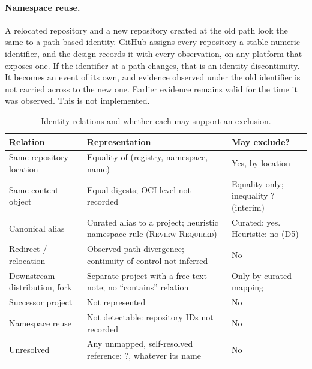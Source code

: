 \documentclass[11pt,a4paper]{article}
\newcommand{\Ind}{\textsf{?}}
\begin{document}
\paragraph{Namespace reuse.} A relocated repository and a new
repository created at the old path look the same to a path-based
identity. GitHub assigns every repository a stable numeric
identifier, and the design records it with every observation, on any
platform that exposes one. If the
identifier at a path changes, that is an identity discontinuity. It
becomes an event of its own, and evidence observed under the old
identifier is not carried across to the new one. Earlier evidence
remains valid for the time it was observed. This is not implemented.

\begin{table}[t]
\centering
\footnotesize
\begin{tabularx}{\linewidth}{@{}>{\raggedright\arraybackslash}p{3.0cm} >{\raggedright\arraybackslash}X >{\raggedright\arraybackslash}p{3.0cm}@{}}
\toprule
Relation & Representation & May exclude? \\
\midrule
Same repository location & Equality of (registry, namespace, name) &
  Yes, by location \\
Same content object & Equal digests; OCI level not recorded & Equality
  only; inequality \Ind{} (interim) \\
Canonical alias & Curated alias to a project; heuristic namespace rule
  (\textsc{Review-Required}) & Curated: yes. Heuristic: no (D5) \\
Redirect / relocation & Observed path divergence; continuity of control
  not inferred & No \\
Downstream distribution, fork & Separate project with a free-text note;
  no ``contains'' relation & Only by curated mapping \\
Successor project & Not represented & No \\
Namespace reuse & Not detectable: repository IDs not recorded & No \\
Unresolved & Any unmapped, self-resolved reference: \Ind{}, whatever
  its name & No \\
\bottomrule
\end{tabularx}
\caption{Identity relations and whether each may support an exclusion.}
\label{tab:relations}
\end{table}
\end{document}
